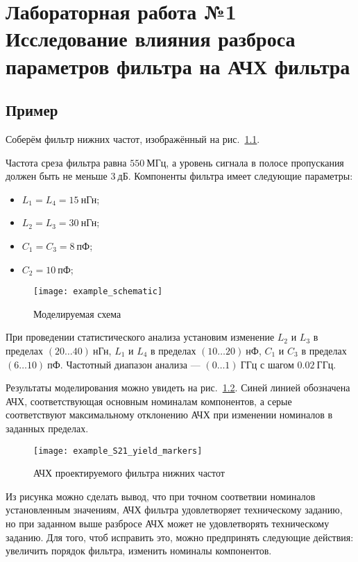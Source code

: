 \chapter{Лабораторная работа №1\\
Исследование влияния разброса параметров фильтра на АЧХ фильтра
}

\section{Пример}

Соберём фильтр нижних частот, изображённый на рис.~\ref{fig:example_schematic}.

Частота среза фильтра равна $550~\text{МГц}$, а уровень сигнала в полосе пропускания должен быть не меньше $3~\text{дБ}$.
Компоненты фильтра имеет следующие параметры:
\begin{itemize}
    \item $L_1 = L_4 = 15~\text{нГн}$;
    \item $L_2 = L_3 = 30~\text{нГн}$;
    \item $C_1 = C_3 = 8~\text{пФ}$;
    \item $C_2 = 10~\text{пФ}$;
\end{itemize}

\begin{figure}[!ht]
    \centering
    \texttt{[image: example\_schematic]}
    \caption{Моделируемая схема}%
    \label{fig:example_schematic}
\end{figure}

При проведении статистического анализа установим изменение $L_2$ и $L_3$ в пределах $(20 \dots 40)~\text{нГн}$, $L_1$ и $L_4$ в пределах $(10 \dots 20)~\text{нФ}$, $C_1$ и $C_3$ в пределах $(6 \dots 10)~\text{пФ}$.
Частотный диапазон анализа --- $(0 \dots 1)~\text{ГГц}$ с шагом $0.02~\text{ГГц}$.

Результаты моделирования можно увидеть на рис.~\ref{fig:example_S21_yield_markers}.
Синей линией обозначена АЧХ, соответствующая основным номиналам компонентов, а серые соответствуют максимальному отклонению АЧХ при изменении номиналов в заданных пределах.

\begin{figure}[!ht]
    \centering
    \texttt{[image: example\_S21\_yield\_markers]}
    \caption{АЧХ проектируемого фильтра нижних частот}%
    \label{fig:example_S21_yield_markers}
\end{figure}

Из рисунка можно сделать вывод, что при точном соответвии номиналов установленным значениям, АЧХ фильтра удовлетворяет техническому заданию, но при заданном выше разбросе АЧХ может не удовлетворять техническому заданию.
Для того, чтоб исправить это, можно предпринять следующие действия: увеличить порядок фильтра, изменить номиналы компонентов.

